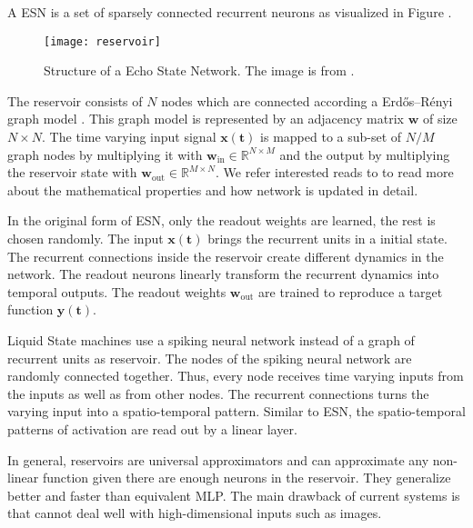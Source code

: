A ESN is a set of sparsely connected recurrent neurons as visualized in Figure .

\begin{figure}[h]
    \centering
    \texttt{[image: reservoir]}
    \caption[Structure of a Echo State Network]{Structure of a Echo State Network. The image is from .}
\end{figure}

The reservoir consists of \(N\) nodes which are connected according a Erdős–Rényi graph model .
This graph model is represented by an adjacency matrix \(\boldsymbol{w}\) of size \(N \times N\).
The time varying input signal \(\boldsymbol{x(t)}\) is mapped to a sub-set of \(N/M\) graph nodes by multiplying it with \(\boldsymbol{w}_{\text{in}} \in \mathbb{R}^{N\times M}\) and the output by multiplying the reservoir state with \(\boldsymbol{w}_{\text{out}} \in \mathbb{R}^{M\times N}\).
We refer interested reads to  to read more about the mathematical properties and how network is updated in detail.

In the original form of ESN, only the readout weights are learned, the rest is chosen randomly.
The input \(\boldsymbol{x(t)}\) brings the recurrent units in a initial state.
The recurrent connections inside the reservoir create different dynamics in the network.
The readout neurons linearly transform the recurrent dynamics into temporal outputs.
The readout weights \(\boldsymbol{w}_{\text{out}}\) are trained to reproduce a target function \(\boldsymbol{y(t)}\).

Liquid State machines use a spiking neural network instead of a graph of recurrent units as reservoir.
The nodes of the spiking neural network are randomly connected together.
Thus, every node receives time varying inputs from the inputs as well as from other nodes.
The recurrent connections turns the varying input into a spatio-temporal pattern.
Similar to ESN, the spatio-temporal patterns of activation are read out by a linear layer.

In general, reservoirs are universal approximators and can approximate any non-linear function given there are enough neurons in the reservoir.
They generalize better and faster than equivalent MLP.
The main drawback of current systems is that cannot deal well with high-dimensional inputs such as images.





